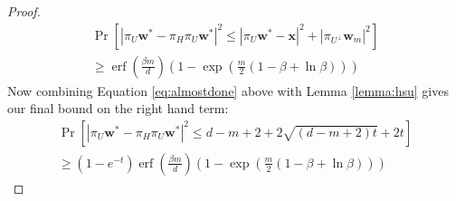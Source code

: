 \documentclass{article}
\theoremstyle{definition}
\DeclareMathOperator*{\vecspan}{span}
\DeclareMathOperator*{\erf}{erf}
\DeclareMathOperator*{\probop}{Pr}
\newcommand{\prob}[1]{\ensuremath{\probop\left[{#1}\right]}}
\newcommand{\proj}[1]{\ensuremath{\pi}_{#1}}
\newcommand{\comp}[1]{\ensuremath{{#1}^\bot}}
\newcommand{\zero}{\mathbf{0}}
\newcommand{\w}{\mathbf{w}}
\newcommand{\x}{\mathbf{x}}
\begin{document}
\begin{proof}
\begin{multline}
\prob{
    |\proj{U}\w^* - \proj{H}\proj{U}\w^*|^2
    \le
    |\proj{U}\w^*-\x|^2 + |\proj{\comp U}\w_m|^2
}
\\
\ge
\erf\left(\frac{\beta m}{d}\right)
\left(1 - \exp\left(\frac{m}{2}(1-\beta+\ln\beta)\right)\right)
\label{eq:almostdone}
\end{multline}
Now combining Equation \ref{eq:almostdone} above with Lemma \ref{lemma:hsu} gives our final bound on the right hand term:
\begin{multline}
\prob{
    |\proj{U}\w^* - \proj{H}\proj{U}\w^*|^2
    \le
    d - m + 2 + 2\sqrt{(d - m + 2)t} + 2t
}
\\
\ge
(1-e^{-t})
\erf\left(\frac{\beta m}{d}\right)
\left(1 - \exp\left(\frac{m}{2}(1-\beta+\ln\beta)\right)\right)
\end{multline}



\end{proof}
\end{document}
